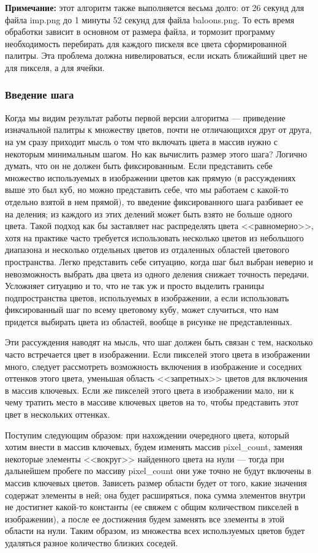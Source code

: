 \documentclass[12pt]{article}
\begin{document}
{	{\bf Примечание:} этот алгоритм также выполняется весьма долго: от 26 секунд для файла imp.png до 1 минуты 52 секунд для файла baloons.png. То есть время обработки зависит в основном от размера файла, и тормозит программу необходимость перебирать для каждого пискеля все цвета сформированной палитры. Эта проблема должна нивелироваться, если искать ближайший цвет не для пикселя, а для ячейки.
	
	\subsubsection{Введение шага}
	
	Когда мы видим результат работы первой версии алгоритма --- приведение изначальной палитры к множеству цветов, почти не отличающихся друг от друга, на ум сразу приходит мысль о том что включать цвета в массив нужно с некоторым минимальным шагом. Но как вычислить размер этого шага? Логично думать, что он не должен быть фиксированным. Если представить себе множество используемых в изображении цветов как прямую (в рассуждениях выше это был куб, но можно представить себе, что мы работаем с какой-то отдельно взятой в нем прямой), то введение фиксированного шага разбивает ее на деления; из каждого из этих делений может быть взято не больше одного цвета. Такой подход как бы заставляет нас распределять цвета <<равномерно>>, хотя на практике часто требуется использовать несколько цветов из небольшого диапазона и несколько отдельных цветов из отдаленных областей цветового пространства. Легко представить себе ситуацию, когда шаг был выбран неверно и невозможность выбрать два цвета из одного деления снижает точность передачи. Усложняет ситуацию и то, что не так уж и просто выделить границы подпространства цветов, используемых в изображении, а если использовать фиксированный шаг по всему цветовому кубу, может случиться, что нам придется выбирать цвета из областей, вообще в рисунке не представленных.
	
	Эти рассуждения наводят на мысль, что шаг должен быть связан с тем, насколько часто встречается цвет в изображении. Если пикселей этого цвета в изображении много, следует рассмотреть возможность включения в изображение и соседних оттенков этого цвета, уменьшая область <<запретных>> цветов для включения в массив ключевых. Если же пикселей этого цвета в изображении мало, ни к чему тратить место в массиве ключевых цветов на то, чтобы представить этот цвет в нескольких оттенках. 
	
	Поступим следующим образом: при нахождении очередного цвета, который хотим внести в массив ключевых, будем изменять массив pixel\_count, заменяя некоторые элементы <<вокруг>> найденного цвета на нули --- тогда при дальнейшем пробеге по массиву pixel\_count они уже точно не будут включены в массив ключевых цветов. Зависеть размер области будет от того, какие значения содержат элементы в ней; она будет расширяться, пока сумма элементов внутри не достигнет какой-то константы (ее свяжем с общим количеством пикселей в изображении), а после ее достижения будем заменять все элементы в этой области на нули. Таким образом, из множества всех используемых цветов будет удаляться разное количество близких соседей.
	
}
\end{document}
